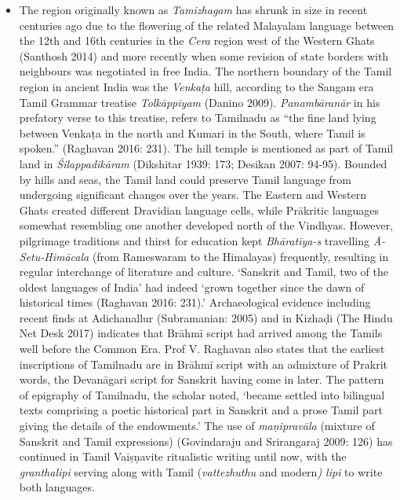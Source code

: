 \begin{itemize}
\item The region originally known as \textit{Tamizhagam} has shrunk in size in recent centuries ago due to the flowering of the related Malayalam language between the 12th and 16th centuries in the \textit{Cera} region west of the Western Ghats (Santhosh 2014) and more recently when some revision of state borders with neighbours was negotiated in free India. The northern boundary of the Tamil region in ancient India was the \textit{Venkaṭa} hill, according to the Sangam era Tamil Grammar treatise \textit{Tolkāppiyam} (Danino 2009). \textit{Panambāranār} in his prefatory verse to this treatise, refers to Tamilnadu as “the fine land lying between Venkaṭa in the north and Kumari in the South, where Tamil is spoken.” (Raghavan 2016: 231). The hill temple is mentioned as part of Tamil land in \textit{Śilappadikāram} (Dikshitar 1939: 173; Desikan 2007: 94-95). Bounded by hills and seas, the Tamil land could preserve Tamil language from undergoing significant changes over the years. The Eastern and Western Ghats created different Dravidian language cells, while Prākritic languages somewhat resembling one another developed north of the Vindhyas. However, pilgrimage traditions and thirst for education kept \textit{Bhāratīya-s} travelling \textit{Ā-Setu-Himācala} (from Rameswaram to the Himalayas) frequently, resulting in regular interchange of literature and culture. ‘Sanskrit and Tamil, two of the oldest languages of India’ had indeed ‘grown together since the dawn of historical times (Raghavan 2016: 231).’ Archaeological evidence including recent finds at Adichanallur (Subramanian: 2005) and in Kizhaḍi (The Hindu Net Desk 2017) indicates that Brāhmī script had arrived among the Tamils well before the Common Era. Prof V. Raghavan also states that the earliest inscriptions of Tamilnadu are in Brāhmī script with an admixture of Prakrit words, the Devanāgari script for Sanskrit having come in later. The pattern of epigraphy of Tamilnadu, the scholar noted, ‘became settled into bilingual texts comprising a poetic historical part in Sanskrit and a prose Tamil part giving the details of the endowments.’ The use of \textit{maṇipravāla} (mixture of Sanskrit and Tamil expressions) (Govindaraju and Srirangaraj 2009: 126) has continued in Tamil Vaiṣṇavite ritualistic writing until now, with the \textit{granthalipi} serving along with Tamil (\textit{vattezhuthu} and modern\textit{) lipi} to write both languages.

\end{itemize}


